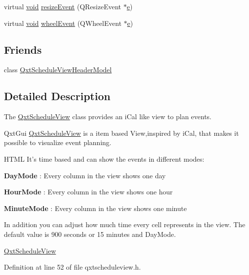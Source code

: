 \begin{DoxyCompactItemize}
\item 
virtual \hyperlink{group___u_a_v_objects_plugin_ga444cf2ff3f0ecbe028adce838d373f5c}{void} \hyperlink{class_qxt_schedule_view_abe42a8cfb17adee7a41b9b121375ccbd}{resize\-Event} (Q\-Resize\-Event $\ast$\hyperlink{_o_p_plots_8m_a9425be9aab51621e317ba7ade564b570}{e})
\item 
virtual \hyperlink{group___u_a_v_objects_plugin_ga444cf2ff3f0ecbe028adce838d373f5c}{void} \hyperlink{class_qxt_schedule_view_afd493ff4c651b3c10998224e7f5f5d74}{wheel\-Event} (Q\-Wheel\-Event $\ast$\hyperlink{_o_p_plots_8m_a9425be9aab51621e317ba7ade564b570}{e})
\end{DoxyCompactItemize}
\subsection*{Friends}
\begin{DoxyCompactItemize}
\item 
class \hyperlink{class_qxt_schedule_view_a3bb224d408555ba47e7e9c9dec4180e9}{Qxt\-Schedule\-View\-Header\-Model}
\end{DoxyCompactItemize}


\subsection{Detailed Description}
The \hyperlink{class_qxt_schedule_view}{Qxt\-Schedule\-View} class provides an i\-Cal like view to plan events. 

Qxt\-Gui \hyperlink{class_qxt_schedule_view}{Qxt\-Schedule\-View} is a item based View,inspired by i\-Cal, that makes it possible to visualize event planning.

H\-T\-M\-L It's time based and can show the events in different modes\-: 
\begin{DoxyItemize}
\item {\bfseries Day\-Mode} \-: Every column in the view shows one day 
\item {\bfseries Hour\-Mode} \-: Every column in the view shows one hour 
\item {\bfseries Minute\-Mode} \-: Every column in the view shows one minute 
\end{DoxyItemize}In addition you can adjust how much time every cell represents in the view. The default value is 900 seconds or 15 minutes and Day\-Mode. 

\hyperlink{class_qxt_schedule_view}{Qxt\-Schedule\-View} 

Definition at line 52 of file qxtscheduleview.\-h.



